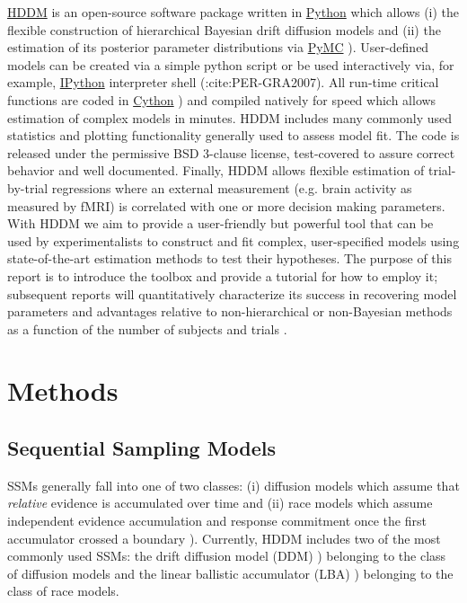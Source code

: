 \documentclass[letterpaper,10pt,english]{sphinxmanual}
\begin{document}
\href{http://github.com/twiecki/hddm}{HDDM} is an open-source software package written in \href{http://www.python.org/}{Python} which
allows (i) the flexible construction of hierarchical Bayesian drift
diffusion models and (ii) the estimation of its posterior parameter
distributions via \href{http://code.google.com/p/pymc/}{PyMC} \citep{PatilHuardFonnesbeck10}). User-defined
models can be created via a simple python script or be used
interactively via, for example, \href{http://ipython.org}{IPython} interpreter shell (:cite:PER-GRA2007). All
run-time critical functions are coded in \href{http://www.cython.org/}{Cython}
\citep{BehnelBradshawCitroEtAl11}) and compiled natively for speed
which allows estimation of complex models in minutes. HDDM includes
many commonly used statistics and plotting functionality generally
used to assess model fit. The code is released under the permissive
BSD 3-clause license, test-covered to assure correct behavior and well
documented. Finally, HDDM allows flexible estimation of trial-by-trial
regressions where an external measurement (e.g. brain activity as
measured by fMRI) is correlated with one or more decision making
parameters.\\

With HDDM we aim to provide a user-friendly but powerful tool that can
be used by experimentalists to construct and fit complex,
user-specified models using state-of-the-art estimation methods to
test their hypotheses. The purpose of this report is to introduce the
toolbox and provide a tutorial for how to employ it; subsequent
reports will quantitatively characterize its success in recovering
model parameters and advantages relative to non-hierarchical or
non-Bayesian methods as a function of the number of subjects and
trials \citep{SoferWieckiFrank}.


\section{Methods}
\label{methods:ipython}\label{methods:index-0}\label{methods::doc}\label{methods:methods}\label{methods:chap-methods}

\subsection{Sequential Sampling Models}
\label{methods:sequential-sampling-models}
SSMs generally fall into one of two classes: (i) diffusion models
which assume that \emph{relative} evidence is accumulated over time
and (ii) race models which assume independent evidence accumulation
and response commitment once the first accumulator crossed a boundary
\citep{LaBerge62,Vickers70}). Currently, HDDM includes two of the most
commonly used SSMs: the drift diffusion model (DDM)
\citep{RatcliffRouder98,RatcliffMcKoon08}) belonging to the
class of diffusion models and the linear ballistic accumulator (LBA)
\citep{BrownHeathcote08}) belonging to the class of race models.
\end{document}
